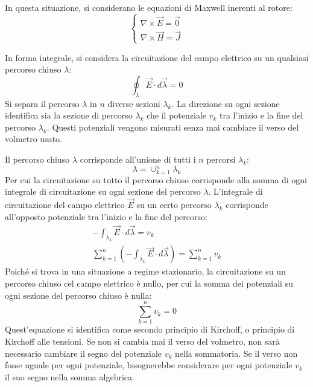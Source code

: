 \documentclass{article}
\numberwithin{equation}{subsection}
\begin{document}
In questa situazione, si considerano le equazioni di Maxwell inerenti al rotore:
\begin{equation*}
    \begin{cases}
        \nabla\times\vec{E}=\vec0\\
        \nabla\times\vec{H}=\vec{J}
    \end{cases}
\end{equation*}


In forma integrale, si considera la circuitazione del campo elettrico su un qualsiasi percorso chiuso $\lambda$:
\begin{equation*}
    \displaystyle\oint_{\lambda}\vec{E}\cdot d\vec{\lambda}=0
\end{equation*}
Si separa il percorso $\lambda$ in $n$ diverse sezioni $\lambda_k$. La direzione su ogni sezione identifica sia la sezione di percorso $\lambda_k$ che il potenziale $v_k$ tra 
l'inizio e la fine del percorso $\lambda_k$. Questi potenziali vengono misurati senza mai cambiare il verso del volmetro usato. 

Il percorso chiuso $\lambda$ corrisponde all'unione di tutti i $n$ percorsi $\lambda_k$:
\begin{equation*}
    \lambda=\cup_{k=1}^n\lambda_k
\end{equation*}
Per cui la circuitazione su tutto il percorso chiuso corrisponde alla somma di ogni integrale di circuitazione su ogni sezione del percorso $\lambda$. L'integrale di circuitazione 
del campo elettrico $\vec{E}$ su un certo percorso $\lambda_k$ corrisponde all'opposto potenziale tra l'inizio e la fine del percorso:
\begin{gather*}
    -\int_{\lambda_k}\vec{E}\cdot d\vec{\lambda}=v_k\\
    \displaystyle\sum_{k=1}^n\left(-\int_{\lambda_k}\vec{E}\cdot d\vec{\lambda}\right)=\sum_{k=1}^nv_k
\end{gather*}
Poiché si trova in una situazione a regime stazionario, la circuitazione su un percorso chiuso cel campo elettrico è nullo, per cui la somma dei potenziali su ogni sezione 
del percorso chiuso è nulla:
\begin{equation}
    \displaystyle\sum_{k=1}^nv_k=0
\end{equation}
Quest'equazione si identifica come secondo principio di Kirchoff, o principio di Kirchoff alle tensioni. 
Se non si cambia mai il verso del volmetro, non sarà necessario cambiare il segno del potenziale $v_k$ nella sommatoria. Se il verso non fosse uguale per ogni potenziale, 
bisognerebbe considerare per ogni potenziale $v_k$ il suo segno nella somma algebrica. 
\end{document}
